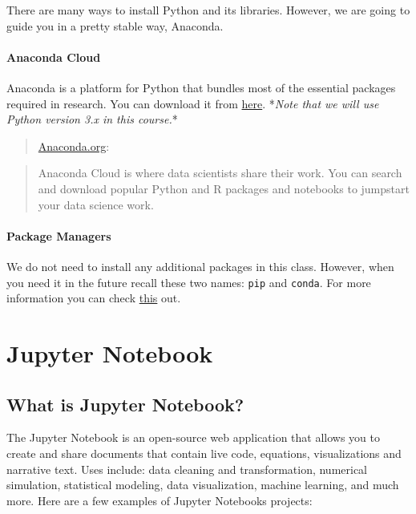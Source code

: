 \documentclass[11pt]{article}
\begin{document}
There are many ways to install Python and its libraries. However, we are
going to guide you in a pretty stable way, Anaconda.

\paragraph{Anaconda Cloud}\label{anaconda-cloud}

Anaconda is a platform for Python that bundles most of the essential
packages required in research. You can download it from
\href{https://www.anaconda.com/download/}{here}. *\emph{Note that we
will use Python version 3.x in this course.}*

\begin{quote}
\href{https://anaconda.org/}{Anaconda.org}:
\end{quote}

\begin{quote}
Anaconda Cloud is where data scientists share their work. You can search
and download popular Python and R packages and notebooks to jumpstart
your data science work.
\end{quote}

\paragraph{Package Managers}\label{package-managers}

We do not need to install any additional packages in this class.
However, when you need it in the future recall these two names:
\texttt{pip} and \texttt{conda}. For more information you can check
\href{https://conda.io/docs/user-guide/tasks/manage-pkgs.html\#installing-packages}{this}
out.

\section{Jupyter Notebook}\label{jupyter-notebook}

\subsection{What is Jupyter Notebook?}\label{what-is-jupyter-notebook}

The Jupyter Notebook is an open-source web application that allows you
to create and share documents that contain live code, equations,
visualizations and narrative text. Uses include: data cleaning and
transformation, numerical simulation, statistical modeling, data
visualization, machine learning, and much more. Here are a few examples
of Jupyter Notebooks projects:
\end{document}
